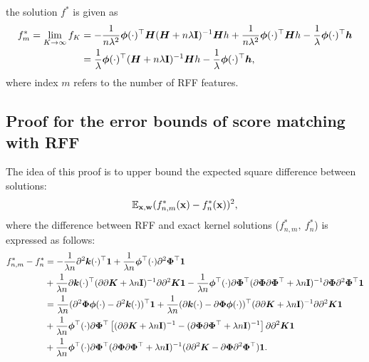 the solution $f^*$ is given as
\begin{align*}
    f_{m}^* = \lim\limits_{K \to \infty} f_K
    &= -\frac{1}{n\lambda^2}{\bm\phi}(\cdot)^{\top}{\bm H}({\bm H} +
    n \lambda {\bf I})^{-1}{\bm Hh} + \frac{1}{n\lambda^2}{\bm \phi}(\cdot)^{\top}{\bm Hh} -
    \frac{1}{\lambda}{\bm \phi}(\cdot)^{\top}{\bm h}\nonumber\\
    &= \frac{1}{\lambda}{\bm \phi}(\cdot)^{\top}({\bm H} + n\lambda{\bf I})^{-1}{\bm Hh}
    - \frac{1}{\lambda}{\bm \phi}(\cdot)^{\top}{\bm h},
\end{align*}
where index $m$ refers to the number of RFF features.




\subsection{Proof for the error bounds of score matching with RFF}
\label{sec:error_bound_proof}
The idea of this proof is to upper bound the expected square difference between solutions:
\begin{equation}
    \mathbb{E}_{{\bf x}, {\bf w}}(f_{n, m}^*({\bf x}) - f_n^*({\bf x}))^2,
\end{equation}
where the difference between RFF and exact kernel solutions ($f_{n, m}^*,~f_n^*$)
is expressed as follows:
\begin{align*}
    f_{n, m}^* - f_n^*
    &= -\frac{1}{\lambda n}\partial^2{\bm k}(\cdot)^{\top}{\bf 1}
    + \frac{1}{\lambda n} {\bm \phi}^{\top}(\cdot)\partial^2\bm{\Phi}^{\top}{\bf 1} \\
    &+ \frac{1}{\lambda n}\partial{\bm k}(\cdot)^{\top}(\partial\partial {\bm K} +
    \lambda n{\bf I})^{-1}\partial\partial^2 {\bm K}{\bf 1}
    -\frac{1}{\lambda n}{\bm \phi}^{\top}(\cdot)\partial\bm{\Phi}^{\top}(\partial\bm{\Phi}
    \partial\bm{\Phi}^{\top} +
    \lambda n {\bf I})^{-1}\partial\bm{\Phi}\partial^2\bm{\Phi}^{\top}{\bf 1} \\
    &= \frac{1}{\lambda n}(\partial^2\bm{\Phi}{\bm \phi}(\cdot) -
    \partial^2{\bm k}(\cdot))^{\top}{\bf 1}
    + \frac{1}{\lambda n}(\partial{\bm k}(\cdot) -
    \partial\bm{\Phi}{\bm \phi}(\cdot))^{\top}(\partial\partial {\bm K} +
    \lambda n{\bf I})^{-1}\partial\partial^2 {\bm K}{\bf 1} \\
    &+ \frac{1}{\lambda n}{\bm \phi}^{\top}(\cdot)\partial\bm{\Phi}^{\top} \left[
        (\partial\partial {\bm K} + \lambda n{\bf I})^{-1} -
        (\partial\bm{\Phi}\partial\bm{\Phi}^{\top} + \lambda n {\bf I})^{-1}
    \right] \partial\partial^2 {\bm K}{\bf 1} \\
    &+ \frac{1}{\lambda n}{\bm \phi}^{\top}(\cdot)\partial\bm{\Phi}^{\top}(\partial\bm{\Phi}
    \partial\bm{\Phi}^{\top} + \lambda n {\bf I})^{-1}(\partial\partial^2 {\bm K} -
    \partial\bm{\Phi}\partial^2\bm{\Phi}^{\top}){\bf 1}.
\end{align*}
